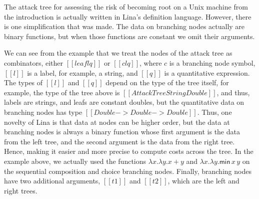 The attack tree for assessing the risk of becoming root on a Unix
machine from the introduction is actually written in Lina's definition
language.  However, there is one simplification that was made.  The
data on branching nodes actually are binary functions, but when those
functions are constant we omit their arguments.

We can see from the example that we treat the nodes of the attack tree
as combinators, either $[[leaf l q]]$ or $[[c l q]]$, where $c$ is a
branching node symbol, $[[l]]$ is a label, for example, a string, and
$[[q]]$ is a quantitative expression.  The types of $[[l]]$ and
$[[q]]$ depend on the type of the tree itself, for example, the type
of the tree above is $[[AttackTree String Double]]$, and thus, labels
are strings, and leafs are constant doubles, but the quantitative data
on branching nodes has type $[[Double -> Double -> Double]]$. Thus,
one novelty of Lina is that data at nodes can be higher order, but the
data at branching nodes is always a binary function whose first
argument is the data from the left tree, and the second argument is
the data from the right tree. Hence, making it easier and more precise
to compute costs across the tree.  In the example above, we actually
used the functions $\lambda x.\lambda y.x + y$ and $\lambda x.\lambda
y.\mathsf{min}\,x\,y$ on the sequential composition and choice
branching nodes.  Finally, branching nodes have two additional
arguments, $[[t1]]$ and $[[t2]]$, which are the left and right trees.

